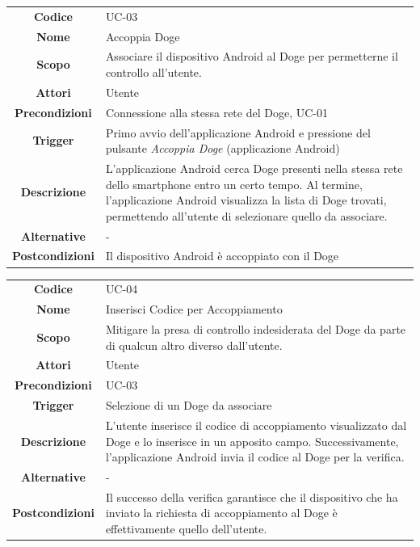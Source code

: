 \documentclass{article}
\begin{document}
    \begin{adjustbox}{center}
    \begin{tabular}{|c|p{10cm}|}
    \hline
    \textbf{Codice} & UC-03 \\
    \textbf{Nome} & Accoppia Doge \\
    \textbf{Scopo} & Associare il dispositivo Android al Doge per permetterne il controllo all'utente. \\
    \textbf{Attori} & Utente \\
    \textbf{Precondizioni} & Connessione alla stessa rete del Doge, UC-01 \\
    \textbf{Trigger} & Primo avvio dell'applicazione Android e pressione del pulsante \emph{Accoppia Doge} (applicazione Android) \\
    \textbf{Descrizione} & L'applicazione Android cerca Doge presenti nella stessa rete dello smartphone entro un certo tempo. Al termine, l'applicazione Android
    visualizza la lista di Doge trovati, permettendo all'utente di
    selezionare quello da associare. \\
    \textbf{Alternative} & - \\
    \textbf{Postcondizioni} & Il dispositivo Android è accoppiato con il Doge \\
    \hline
    \end{tabular}
    \end{adjustbox}
    
    \begin{adjustbox}{center}
    \begin{tabular}{|c|p{10cm}|}
    \hline
    \textbf{Codice} & UC-04 \\
    \textbf{Nome} & Inserisci Codice per Accoppiamento \\
    \textbf{Scopo} & Mitigare la presa di controllo indesiderata del Doge da parte di qualcun altro diverso dall'utente. \\
    \textbf{Attori} & Utente \\
    \textbf{Precondizioni} & UC-03 \\
    \textbf{Trigger} & Selezione di un Doge da associare \\
    \textbf{Descrizione} & L'utente inserisce il codice di accoppiamento visualizzato dal Doge e lo inserisce in un apposito campo. Successivamente, l'applicazione
    Android invia il codice al Doge per la verifica. \\
    \textbf{Alternative} & - \\
    \textbf{Postcondizioni} & Il successo della verifica garantisce che il dispositivo che ha inviato la richiesta di accoppiamento al Doge è effettivamente quello
    dell'utente. \\
    \hline
    \end{tabular}
    \end{adjustbox}
    
\end{document}
